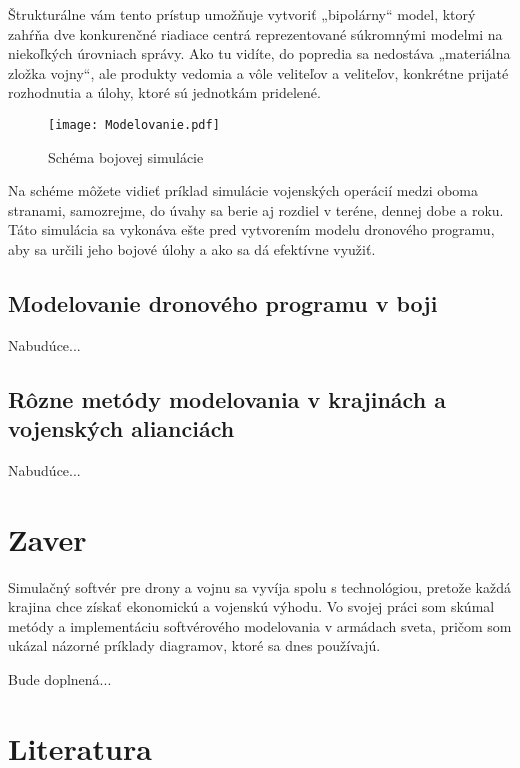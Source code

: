 \documentclass{article}
\begin{document}
Štrukturálne vám tento prístup umožňuje vytvoriť „bipolárny“ model, ktorý zahŕňa dve konkurenčné riadiace centrá reprezentované súkromnými modelmi na niekoľkých úrovniach správy. Ako tu vidíte, do popredia sa nedostáva „materiálna zložka vojny“, ale produkty vedomia a vôle veliteľov a veliteľov, konkrétne prijaté rozhodnutia a úlohy, ktoré sú jednotkám pridelené.

\begin{figure}[h]

\centering

\texttt{[image: Modelovanie.pdf]}

\caption{Schéma bojovej simulácie}

\label{fig:mpr}

\end{figure}

Na schéme môžete vidieť príklad simulácie vojenských operácií medzi oboma stranami, samozrejme, do úvahy sa berie aj rozdiel v teréne, dennej dobe a roku. Táto simulácia sa vykonáva ešte pred vytvorením modelu dronového programu, aby sa určili jeho bojové úlohy a ako sa dá efektívne využiť. 

\subsection{Modelovanie dronového programu v boji}

Nabudúce...

\subsection{Rôzne metódy modelovania v krajinách a vojenských alianciách}

Nabudúce...

\newpage

\section{Zaver}

Simulačný softvér pre drony a vojnu sa vyvíja spolu s technológiou, pretože každá krajina chce získať ekonomickú a vojenskú výhodu. Vo svojej práci som skúmal metódy a implementáciu softvérového modelovania v armádach sveta, pričom som ukázal názorné príklady diagramov, ktoré sa dnes používajú.

Bude doplnená...

\newpage

\section{Literatura}


\end{document}
